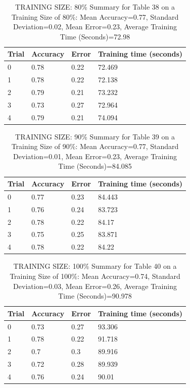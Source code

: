 \documentclass{article}
\begin{document}
\begin{table}[H]

\centering
{\begin{tabular}{||p{1cm}|p{1.8cm}|p{1.8cm}|p{3cm}||}
 \hline
Trial & Accuracy & Error & Training time (seconds) \\ [0.5ex] 
 \hline\hline
   0  & 0.78  & 0.22  & 72.469\\
\hline
   1  & 0.78  & 0.22  & 72.138\\
\hline
   2  & 0.79  & 0.21  & 73.232\\
\hline
   3  & 0.73  & 0.27  & 72.964\\
\hline
   4  & 0.79  & 0.21  & 74.094\\
\hline
\end{tabular}}
\caption{TRAINING SIZE: 80\% \newline Summary for Table 38 on a Training Size of 80\%: Mean Accuracy=0.77, Standard Deviation=0.02, Mean Error=0.23, Average Training Time (Seconds)=72.98}
\end{table} 

\begin{table}[H]

\centering
{\begin{tabular}{||p{1cm}|p{1.8cm}|p{1.8cm}|p{3cm}||}
 \hline
Trial & Accuracy & Error & Training time (seconds) \\ [0.5ex] 
 \hline\hline
   0  & 0.77  & 0.23  & 84.443\\
\hline
   1  & 0.76  & 0.24  & 83.723\\
\hline
   2  & 0.78  & 0.22  & 84.17\\
\hline
   3  & 0.75  & 0.25  & 83.871\\
\hline
   4  & 0.78  & 0.22  & 84.22\\
\hline
\end{tabular}}
\caption{TRAINING SIZE: 90\% \newline Summary for Table 39 on a Training Size of 90\%: Mean Accuracy=0.77, Standard Deviation=0.01, Mean Error=0.23, Average Training Time (Seconds)=84.085}
\end{table} 

\begin{table}[H]

\centering
{\begin{tabular}{||p{1cm}|p{1.8cm}|p{1.8cm}|p{3cm}||}
 \hline
Trial & Accuracy & Error & Training time (seconds) \\ [0.5ex] 
 \hline\hline
   0  & 0.73  & 0.27  & 93.306\\
\hline
   1  & 0.78  & 0.22  & 91.718\\
\hline
   2  & 0.7  & 0.3  & 89.916\\
\hline
   3  & 0.72  & 0.28  & 89.939\\
\hline
   4  & 0.76  & 0.24  & 90.01\\
\hline
\end{tabular}}
\caption{TRAINING SIZE: 100\% \newline Summary for Table 40 on a Training Size of 100\%: Mean Accuracy=0.74, Standard Deviation=0.03, Mean Error=0.26, Average Training Time (Seconds)=90.978}
\end{table} 
\end{document}
